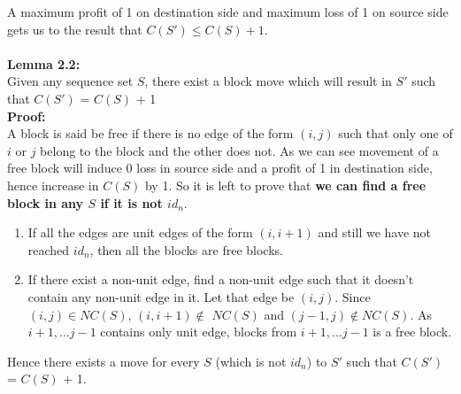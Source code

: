 \documentclass[BTech]{iitmdiss}
\begin{document}
A maximum profit of 1 on destination side and maximum loss of 1 on source side gets us to the result that $C(S') \leq  C(S) + 1.$\\~\\
\textbf{Lemma 2.2:}\\
Given any sequence set $S$, there exist a block move which will result in $S'$ such that $C(S')$ = $C(S)$ + 1\\
\textbf{Proof:}\\
A block is said be free if there is no edge of the form $(i,j)$ such that only one of $i$ or $j$ belong to the block and the other does not. As we can see movement of a free block will induce 0 loss in source side and a profit of 1 in destination side, hence increase in $C(S)$ by 1. So it is left to prove that \textbf{we can find a free block in any $S$ if it is not $id_n$}.
\begin{enumerate}
    \item If all the edges are unit edges of the form $(i,i+1)$ and still we have not reached $id_n$, then all the blocks are free blocks.
    \item If there exist a non-unit edge, find a non-unit edge such that it doesn't contain any non-unit edge in it. Let that edge be $(i,j)$. Since $(i,j) \in NC(S)$, $(i,i+1) \notin$ $NC(S)$ and $(j-1,j) \notin NC(S)$. As $i+1,...j-1$ contains only unit edge, blocks from $i+1,...j-1$ is a free block.
\end{enumerate}
Hence there exists a move for every $S$ (which is not $id_n$) to $S'$ such that $C(S')$ = $C(S)$ + 1.\\~\\
\end{document}
